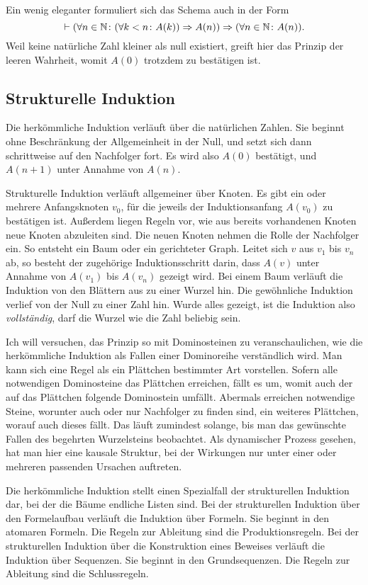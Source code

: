 \noindent
Ein wenig eleganter formuliert sich das Schema auch in der Form
\[\vdash (\forall n\in\mathbb N\colon (\forall k < n\colon A(k))\Rightarrow A(n))
\Rightarrow (\forall n\in\mathbb N\colon A(n)).\]
Weil keine natürliche Zahl kleiner als null existiert, greift hier
das Prinzip der leeren Wahrheit, womit $A(0)$ trotzdem zu bestätigen
ist.

\subsection{Strukturelle Induktion}

Die herkömmliche Induktion verläuft über die natürlichen Zahlen.
Sie beginnt ohne Beschränkung der Allgemeinheit in der Null, und setzt
sich dann schrittweise auf den Nachfolger fort. Es wird also $A(0)$
bestätigt, und $A(n+1)$ unter Annahme von $A(n)$.

Strukturelle Induktion verläuft allgemeiner über Knoten. Es gibt ein
oder mehrere Anfangsknoten $v_0$, für die jeweils der Induktionsanfang $A(v_0)$
zu bestätigen ist. Außerdem liegen Regeln vor, wie aus bereits vorhandenen
Knoten neue Knoten abzuleiten sind. Die neuen Knoten nehmen die Rolle der
Nachfolger ein. So entsteht ein Baum oder ein gerichteter Graph.
Leitet sich $v$ aus $v_1$ bis $v_n$ ab, so besteht der zugehörige
Induktionsschritt darin, dass $A(v)$ unter Annahme von $A(v_1)$
bis $A(v_n)$ gezeigt wird. Bei einem Baum verläuft die Induktion von
den Blättern aus zu einer Wurzel hin. Die gewöhnliche Induktion verlief
von der Null zu einer Zahl hin. Wurde alles gezeigt, ist die Induktion
also \emph{vollständig}, darf die Wurzel wie die Zahl beliebig sein.

Ich will versuchen, das Prinzip so mit Dominosteinen zu veranschaulichen,
wie die herkömmliche Induktion als Fallen einer Dominoreihe verständlich
wird. Man kann sich eine Regel als ein Plättchen bestimmter Art vorstellen.
Sofern alle notwendigen Dominosteine das Plättchen erreichen, fällt es
um, womit auch der auf das Plättchen folgende Dominostein umfällt.
Abermals erreichen notwendige Steine, worunter auch oder nur Nachfolger
zu finden sind, ein weiteres Plättchen, worauf auch dieses fällt.
Das läuft zumindest solange, bis man das gewünschte Fallen des
begehrten Wurzelsteins beobachtet. Als dynamischer Prozess gesehen,
hat man hier eine kausale Struktur, bei der Wirkungen nur unter einer
oder mehreren passenden Ursachen auftreten.

Die herkömmliche Induktion stellt einen Spezialfall der strukturellen
Induktion dar, bei der die Bäume endliche Listen sind. Bei
der strukturellen Induktion über den Formelaufbau verläuft die Induktion
über Formeln. Sie beginnt in den atomaren Formeln. Die Regeln zur
Ableitung sind die Produktionsregeln. Bei der strukturellen Induktion
über die Konstruktion eines Beweises verläuft die Induktion über
Sequenzen. Sie beginnt in den Grundsequenzen. Die Regeln zur Ableitung
sind die Schlussregeln.

